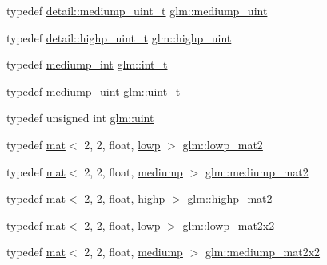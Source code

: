 \begin{DoxyCompactItemize}
\item 
typedef \mbox{\hyperlink{namespaceglm_1_1detail_a98f572e92099cc1b5740f1ccf1c80f8d}{detail\+::mediump\+\_\+uint\+\_\+t}} \mbox{\hyperlink{group__core__precision_ga08ae38ad78ade3539fdd1d25052b8c51}{glm\+::mediump\+\_\+uint}}
\item 
typedef \mbox{\hyperlink{namespaceglm_1_1detail_a994c05c8a976cc902a7cd193ad36bbba}{detail\+::highp\+\_\+uint\+\_\+t}} \mbox{\hyperlink{group__core__precision_gabfd1cf11193324a5f77d3831b6ac3205}{glm\+::highp\+\_\+uint}}
\item 
typedef \mbox{\hyperlink{group__core__precision_ga2a3dcbcd7f4e17663d393a12061ac6ac}{mediump\+\_\+int}} \mbox{\hyperlink{group__core__precision_gacd01d170508f812968875b0f2e730e8c}{glm\+::int\+\_\+t}}
\item 
typedef \mbox{\hyperlink{group__core__precision_ga08ae38ad78ade3539fdd1d25052b8c51}{mediump\+\_\+uint}} \mbox{\hyperlink{group__core__precision_ga5f2ae871c284c9d39ae8fdbb1305b566}{glm\+::uint\+\_\+t}}
\item 
typedef unsigned int \mbox{\hyperlink{group__core__precision_ga4fd29415871152bfb5abd588334147c8}{glm\+::uint}}
\item 
typedef \mbox{\hyperlink{structglm_1_1mat}{mat}}$<$ 2, 2, float, \mbox{\hyperlink{namespaceglm_a36ed105b07c7746804d7fdc7cc90ff25ae161af3fc695e696ce3bf69f7332bc2d}{lowp}} $>$ \mbox{\hyperlink{group__core__precision_ga786e43e2a310fa4bddba3e41b786aa82}{glm\+::lowp\+\_\+mat2}}
\item 
typedef \mbox{\hyperlink{structglm_1_1mat}{mat}}$<$ 2, 2, float, \mbox{\hyperlink{namespaceglm_a36ed105b07c7746804d7fdc7cc90ff25a6416f3ea0c9025fb21ed50c4d6620482}{mediump}} $>$ \mbox{\hyperlink{group__core__precision_ga698131fdb127cb55e8b70cc1b2c4ff67}{glm\+::mediump\+\_\+mat2}}
\item 
typedef \mbox{\hyperlink{structglm_1_1mat}{mat}}$<$ 2, 2, float, \mbox{\hyperlink{namespaceglm_a36ed105b07c7746804d7fdc7cc90ff25ac6f7eab42eacbb10d59a58e95e362074}{highp}} $>$ \mbox{\hyperlink{group__core__precision_gae7066dac53a008363d6faeabf46ccb03}{glm\+::highp\+\_\+mat2}}
\item 
typedef \mbox{\hyperlink{structglm_1_1mat}{mat}}$<$ 2, 2, float, \mbox{\hyperlink{namespaceglm_a36ed105b07c7746804d7fdc7cc90ff25ae161af3fc695e696ce3bf69f7332bc2d}{lowp}} $>$ \mbox{\hyperlink{group__core__precision_gaab9064a0fd0e3ac8d4ae8ceb2dc4fe56}{glm\+::lowp\+\_\+mat2x2}}
\item 
typedef \mbox{\hyperlink{structglm_1_1mat}{mat}}$<$ 2, 2, float, \mbox{\hyperlink{namespaceglm_a36ed105b07c7746804d7fdc7cc90ff25a6416f3ea0c9025fb21ed50c4d6620482}{mediump}} $>$ \mbox{\hyperlink{group__core__precision_gaa7581ec892b01e6ba19c4fdbc7c60df4}{glm\+::mediump\+\_\+mat2x2}}

\end{DoxyCompactItemize}
